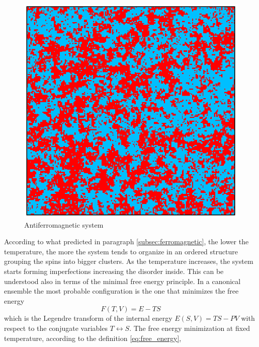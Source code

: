 \begin{figure}[h]
\begin{minipage}[c]{0.45\textwidth}
    \end{minipage}
    \hfill
    \begin{minipage}[c]{\textwidth}
        \centering
        \includegraphics[scale=0.45]{./images/ising/T_n065_antiferro.eps}
    \end{minipage}
    \centering 
    \caption{Antiferromagnetic system}
    \label{fig:MC_single_final_state_antiferro}
\end{figure}
According to what predicted in paragraph \ref{subsec:ferromagnetic}, the lower the temperature, the more the system tends to organize
in an ordered structure grouping the spins into bigger clusters. As the temperature increases, the system starts forming imperfections increasing the disorder inside. This can be understood 
also in terms of the minimal free energy principle. In a canonical ensemble the most probable configuration is the one that minimizes the free energy
\begin{equation}
    F(T, V) = E - TS
    \label{eq:free_energy}
\end{equation}
which is the Legendre transform of the internal energy $E(S, V) = TS - PV$ with respect to the conjugate variables $T \leftrightarrow S$. The free energy minimization at fixed temperature, according to the definition \ref{eq:free_energy},

